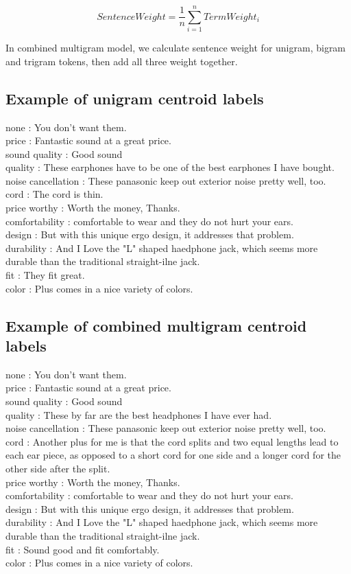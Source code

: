 \documentclass[a4paper]{article}
\begin{document}
$$SentenceWeight = \frac{1}{n} \sum_{i=1}^{n} TermWeight_i $$

In combined multigram model, we calculate sentence weight for unigram, bigram and trigram tokens, then add all three weight together.

\subsection{Example of unigram centroid labels}

none : You don't want them.\\
price : Fantastic sound at a great price.\\
sound quality : Good sound\\
quality : These earphones have to be one of the best earphones I have bought.\\
noise cancellation : These panasonic keep out exterior noise pretty well, too.\\
cord : The cord is thin.\\
price worthy : Worth the money, Thanks.\\
comfortability : comfortable to wear and they do not hurt your ears.\\
design : But with this unique ergo design, it addresses that problem.\\
durability : And I Love the "L" shaped haedphone jack, which seems more durable than the traditional straight-ilne jack.\\
fit : They fit great.\\
color : Plus comes in a nice variety of colors.\\

\subsection{Example of combined multigram centroid labels}

none : You don't want them.\\
price : Fantastic sound at a great price.\\
sound quality : Good sound\\
quality : These by far are the best headphones I have ever had.\\
noise cancellation : These panasonic keep out exterior noise pretty well, too.\\
cord : Another plus for me is that the cord splits and two equal lengths lead to each ear piece, as opposed to a short cord for one side and a longer cord for the other side after the split.\\
price worthy : Worth the money, Thanks.\\
comfortability : comfortable to wear and they do not hurt your ears.\\
design : But with this unique ergo design, it addresses that problem.\\
durability : And I Love the "L" shaped haedphone jack, which seems more durable than the traditional straight-ilne jack.\\
fit : Sound good and fit comfortably.\\
color : Plus comes in a nice variety of colors.\\
\end{document}
